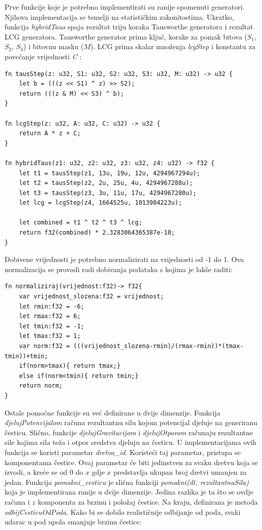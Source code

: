 \documentclass{foi}
\begin{document}
Prve funkcije koje je potrebno implementirati su ranije spomenuti generatori. Njihova implementacija se temelji na statističkim zakonitostima. Ukratko, funkcija \textit{hybridTaus} spaja rezultat triju koraka Tausworthe generatora i rezultat LCG generatora. Tausworthe generator prima ključ, korake za pomak bitova ($S_1$, $S_2$, $S_3$) i bitovnu masku ($M$). LCG prima skalar množenja \textit{lcgStep} i konstantu za povećanje vrijednosti \textit{C} \parencite{NvidiaPRNG}:

\begin{verbatim}
fn tausStep(z: u32, S1: u32, S2: u32, S3: u32, M: u32) -> u32 {
	let b = (((z << S1) ^ z) >> S2);
	return (((z & M) << S3) ^ b);
}

fn lcgStep(z: u32, A: u32, C: u32) -> u32 {
	return A * z + C;
}

fn hybridTaus(z1: u32, z2: u32, z3: u32, z4: u32) -> f32 {
	let t1 = tausStep(z1, 13u, 19u, 12u, 4294967294u);
	let t2 = tausStep(z2, 2u, 25u, 4u, 4294967288u);
	let t3 = tausStep(z3, 3u, 11u, 17u, 4294967280u);
	let lcg = lcgStep(z4, 1664525u, 1013904223u);
	
	let combined = t1 ^ t2 ^ t3 ^ lcg;
	return f32(combined) * 2.3283064365387e-10;
}
\end{verbatim}

Dobivene vrijednosti je potrebno normalizirati na vrijednosti od -1 do 1. Ova normalizacija se provodi radi dobivanja podataka s kojima je lakše raditi\parencite{NormalizacijaPodataka}:
\begin{verbatim}
fn normaliziraj(vrijednost:f32)-> f32{
	var vrijednost_slozena:f32 = vrijednost;
	let rmin:f32 = -6;
	let rmax:f32 = 6;
	let tmin:f32 = -1;
	let tmax:f32 = 1;
	var norm:f32 = (((vrijednost_slozena-rmin)/(rmax-rmin))*(tmax-tmin))+tmin;
	if(norm>tmax){ return tmax;}
	else if(norm<tmin){ return tmin;}
	return norm;
}
\end{verbatim}

Ostale pomoćne funkcije su već definirane u dvije dimenzije. Funkcija \textit{djelujPotencijalom} računa rezultantnu silu kojom potencijal djeluje na generiranu česticu. Slično, funkcije \textit{djelujGravitacijom} i \textit{djelujOtporom} računaju rezultantne sile kojima sila teža i otpor sredstva djeluju na česticu. U implementacijama ovih funkcija se koristi parametar \textit{dretva\_id}. Koristeći taj parametar, pristupa se komponentama čestice. Ovaj parametar će biti jedinstven za svaku dretvu koja se izvodi, a kreće se od 0 do $x$ gdje $x$ predstavlja ukupan broj dretvi umanjen za jedan.  Funkcija \textit{pomakni\_cesticu} je slična funkciji  \textit{pomakni(dt, rezultantnaSila)} koja je implementirana ranije u dvije dimenzije. Jedina razlika je ta što se ovdje računa i $z$ komponenta za brzinu i položaj čestice. Na kraju, definirana je metoda \textit{odbijCesticuOdPoda}. Kako bi se dobilo realističnije odbijanje od poda, svaki udarac u pod upola smanjuje brzinu čestice:
	
\end{document}
